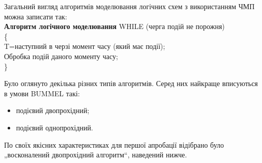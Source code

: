 \documentclass[12pt,a4paper]{article}
\begin{document}
Загальний вигляд алгоритмів моделювання логічних схем з використанням ЧМП можна записати так:\\
\textbf{Алгоритм логічного моделювання}
WHILE (черга подій не порожня)\\
\{\\
\-\hspace{1cm}  T=наступний в черзі момент часу (який має події);\\
\-\hspace{1cm}  Обробка подій даного моменту часу;\\
\}

Було оглянуто декілька різних типів алгоритмів. Серед них найкраще вписуються в умови BUMMEL такі:
\begin{itemize}
  \item подієвий двопрохідний;
  \item подієвий однопрохідний.
\end{itemize}

По своїх якісних характеристиках для першої апробації відібрано було „восконалений двопрохідний алгоритм“, наведений нижче.
\end{document}
